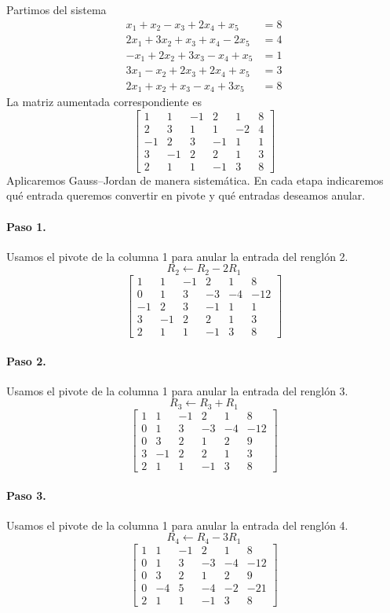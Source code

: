 \documentclass[12pt]{article}
\theoremstyle{remark}
\begin{document}
Partimos del sistema
\[
\begin{aligned}
x_{1} + x_{2} - x_{3} + 2 x_{4} + x_{5} &= 8\\
2 x_{1} + 3 x_{2} + x_{3} + x_{4} - 2 x_{5} &= 4\\
- x_{1} + 2 x_{2} + 3 x_{3} - x_{4} + x_{5} &= 1\\
3 x_{1} - x_{2} + 2 x_{3} + 2 x_{4} + x_{5} &= 3\\
2 x_{1} + x_{2} + x_{3} - x_{4} + 3 x_{5} &= 8
\end{aligned}
\]
La matriz aumentada correspondiente es
\[
\left[\begin{array}{ccccc|c}
1 & 1 & -1 & 2 & 1 & 8\\
2 & 3 & 1 & 1 & -2 & 4\\
-1 & 2 & 3 & -1 & 1 & 1\\
3 & -1 & 2 & 2 & 1 & 3\\
2 & 1 & 1 & -1 & 3 & 8
\end{array}\right]
\]
Aplicaremos Gauss--Jordan de manera sistemática. En cada etapa indicaremos qué entrada queremos convertir en pivote y qué entradas deseamos anular.
\paragraph{Paso 1.} Usamos el pivote de la columna 1 para anular la entrada del renglón 2.
\[
R_{2}\leftarrow R_{2}-2R_{1}
\]
\[
\left[\begin{array}{ccccc|c}
1 & 1 & -1 & 2 & 1 & 8\\
0 & 1 & 3 & -3 & -4 & -12\\
-1 & 2 & 3 & -1 & 1 & 1\\
3 & -1 & 2 & 2 & 1 & 3\\
2 & 1 & 1 & -1 & 3 & 8
\end{array}\right]
\]
\paragraph{Paso 2.} Usamos el pivote de la columna 1 para anular la entrada del renglón 3.
\[
R_{3}\leftarrow R_{3}+R_{1}
\]
\[
\left[\begin{array}{ccccc|c}
1 & 1 & -1 & 2 & 1 & 8\\
0 & 1 & 3 & -3 & -4 & -12\\
0 & 3 & 2 & 1 & 2 & 9\\
3 & -1 & 2 & 2 & 1 & 3\\
2 & 1 & 1 & -1 & 3 & 8
\end{array}\right]
\]
\paragraph{Paso 3.} Usamos el pivote de la columna 1 para anular la entrada del renglón 4.
\[
R_{4}\leftarrow R_{4}-3R_{1}
\]
\[
\left[\begin{array}{ccccc|c}
1 & 1 & -1 & 2 & 1 & 8\\
0 & 1 & 3 & -3 & -4 & -12\\
0 & 3 & 2 & 1 & 2 & 9\\
0 & -4 & 5 & -4 & -2 & -21\\
2 & 1 & 1 & -1 & 3 & 8
\end{array}\right]
\]
\end{document}
